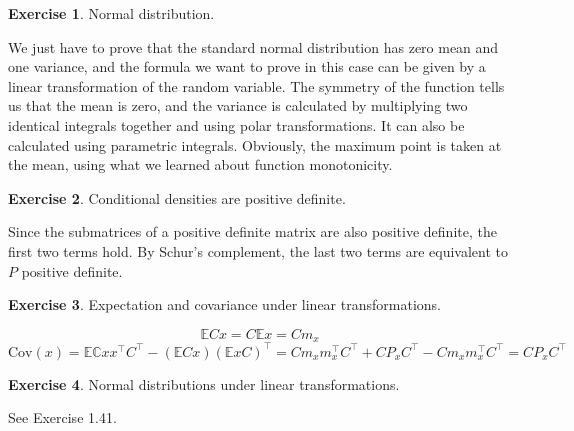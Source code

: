 \documentclass[11pt,a4paper]{report}
\theoremstyle{definition}\newtheorem{exercise}{Exercise}[chapter]
\begin{document}
\begin{exercise}Normal distribution.\\
\end{exercise}
\begin{answer}
    We just have to prove that the standard normal distribution has zero mean and one variance, and the formula we want to prove in this case can be given by a linear transformation of the random variable. The symmetry of the function tells us that the mean is zero, and the variance is calculated by multiplying two identical integrals together and using polar transformations. It can also be calculated using parametric integrals. Obviously, the maximum point is taken at the mean, using what we learned about function monotonicity.
\end{answer}


\begin{exercise}Conditional densities are positive definite.\\
\end{exercise}
\begin{answer}
    Since the submatrices of a positive definite matrix are also positive definite, the first two terms hold. By Schur's complement, the last two terms are equivalent to $P$ positive definite.
\end{answer}


\begin{exercise}Expectation and covariance under linear transformations.
\end{exercise}
\begin{answer}
\begin{equation}
    \mathbb{E}Cx=C\mathbb{E}x=Cm_x
\end{equation}
\begin{equation}
    \text{Cov}(x)=\mathbb{EC}x x^\top C^\top -(\mathbb{E}Cx) (\mathbb{E}xC)^\top= Cm_x m_x^\top C^\top + CP_x C^\top- C m_x m_x^\top C^\top =CP_x C^\top
\end{equation}
\end{answer}


\begin{exercise}Normal distributions under linear transformations.\\    
\end{exercise}
\begin{answer}
    See Exercise 1.41.
\end{answer}
\end{document}
